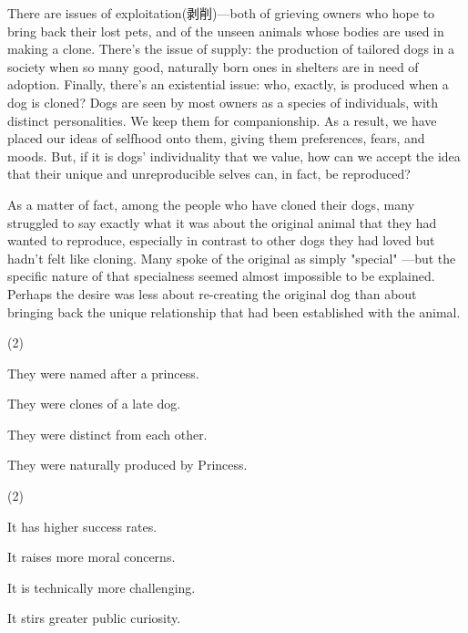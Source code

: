 \documentclass{英语试卷}
\begin{document}
\par There are issues of exploitation(剥削)—both of grieving owners who hope to bring back their lost pets, and of the unseen animals whose bodies are used in making a clone. There's the issue of supply: the production of tailored dogs in a society when so many good, naturally born ones in shelters are in need of adoption. Finally, there's an existential issue: who, exactly, is produced when a dog is cloned? Dogs are seen by most owners as a species of individuals, with distinct personalities. We keep them for companionship. As a result, we have placed our ideas of selfhood onto them, giving them preferences, fears, and moods. But, if it is dogs' individuality that we value, how can we accept the idea that their unique and unreproducible selves can, in fact, be reproduced?\par
\par As a matter of fact, among the people who have cloned their dogs, many struggled to say exactly what it was about the original animal that they had wanted to reproduce, especially in contrast to other dogs they had loved but hadn't felt like cloning. Many spoke of the original as simply "special" —but the specific nature of that specialness seemed almost impossible to be explained. Perhaps the desire was less about re-creating the original dog than about bringing back the unique relationship that had been established with the animal.\par
{}
\begin{choices}(2)
  \item They were named after a princess.
  \item They were clones of a late dog.
  \item They were distinct from each other.
  \item They were naturally produced by Princess.
\end{choices}
\begin{choices}(2)
  \item It has higher success rates.
  \item It raises more moral concerns.
  \item It is technically more challenging.
  \item It stirs greater public curiosity.
\end{choices}
\end{document}
